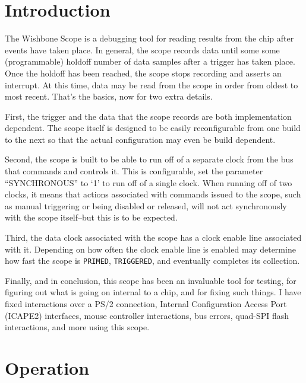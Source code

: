 \documentclass{gqtekspec}
\begin{document}
\chapter{Introduction}
\setcounter{page}{1}

The Wishbone Scope is a debugging tool for reading results from the chip after
events have taken place.  In general, the scope records data until some
some (programmable) holdoff number of data samples after a trigger has taken 
place.  Once the holdoff has been reached, the scope stops recording and 
asserts an interrupt.  At this time, data may be read from the scope in order 
from oldest to most recent.  That's the basics, now for two extra details.
 
First, the trigger and the data that the scope records are both implementation 
dependent.  The scope itself is designed to be easily reconfigurable from one 
build to the next so that the actual configuration may even be build dependent.
 
Second, the scope is built to be able to run off of a separate clock from the
bus that commands and controls it.  This is configurable, set the parameter
``SYNCHRONOUS'' to `1' to run off of a single clock.  When running off of two
clocks, it means that actions associated with commands issued to the scope, 
such as manual triggering or being disabled or released, will not act 
synchronously with the scope itself--but this is to be expected.

Third, the data clock associated with the scope has a clock enable line
associated with it.  Depending on how often the clock enable line is enabled
may determine how fast the scope is {\tt PRIMED}, {\tt TRIGGERED}, and eventually completes
its collection.

Finally, and in conclusion, this scope has been an invaluable tool for
testing, for figuring out what is going on internal to a chip, and for fixing
such things.  I have fixed interactions over a PS/2 connection, Internal 
Configuration Access Port (ICAPE2) interfaces, mouse controller interactions,
bus errors, quad-SPI flash interactions, and more using this scope.
 
\chapter{Operation}
 
\end{document}
